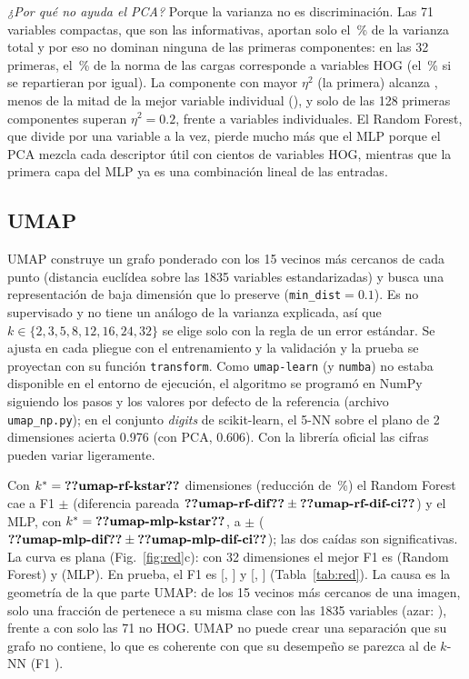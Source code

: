 \documentclass[journal]{IEEEtran}
\begin{document}
\emph{¿Por qué no ayuda el PCA?} Porque la varianza no es discriminación. Las 71 variables compactas, que son las informativas, aportan solo el \,\% de la varianza total y por eso no dominan ninguna de las primeras componentes: en las 32 primeras, el \,\% de la norma de las cargas corresponde a variables HOG (el \,\% si se repartieran por igual). La componente con mayor $\eta^2$ (la primera) alcanza , menos de la mitad de la mejor variable individual (), y solo  de las 128 primeras componentes superan $\eta^2=0.2$, frente a  variables individuales. El Random Forest, que divide por una variable a la vez, pierde mucho más que el MLP porque el PCA mezcla cada descriptor útil con cientos de variables HOG, mientras que la primera capa del MLP ya es una combinación lineal de las entradas.

\subsection{UMAP}\label{sec:umap}
UMAP \cite{mcinnes2018} construye un grafo ponderado con los 15 vecinos más cercanos de cada punto (distancia euclídea sobre las 1835 variables estandarizadas) y busca una representación de baja dimensión que lo preserve (\texttt{min\_dist}$=0.1$). Es no supervisado y no tiene un análogo de la varianza explicada, así que $k\in\{2,3,5,8,12,16,24,32\}$ se elige solo con la regla de un error estándar. Se ajusta en cada pliegue con el entrenamiento y la validación y la prueba se proyectan con su función \texttt{transform}. Como \texttt{umap-learn} (y \texttt{numba}) no estaba disponible en el entorno de ejecución, el algoritmo se programó en NumPy siguiendo los pasos y los valores por defecto de la referencia (archivo \texttt{umap\_np.py}); en el conjunto \emph{digits} de scikit-learn, el 5-NN sobre el plano de 2 dimensiones acierta 0.976 (con PCA, 0.606). Con la librería oficial las cifras pueden variar ligeramente.

Con $k^*=\N{umap-rf-kstar}$ dimensiones (reducción de \,\%) el Random Forest cae a F1 $\pm$ (diferencia pareada $\N{umap-rf-dif}\pm\N{umap-rf-dif-ci}$) y el MLP, con $k^*=\N{umap-mlp-kstar}$, a $\pm$ ($\N{umap-mlp-dif}\pm\N{umap-mlp-dif-ci}$); las dos caídas son significativas. La curva es plana (Fig.~\ref{fig:red}c): con 32 dimensiones el mejor F1 es  (Random Forest) y  (MLP). En prueba, el F1 es  [, ] y  [, ] (Tabla~\ref{tab:red}). La causa es la geometría de la que parte UMAP: de los 15 vecinos más cercanos de una imagen, solo una fracción de  pertenece a su misma clase con las 1835 variables (azar: ), frente a  con solo las 71 no HOG. UMAP no puede crear una separación que su grafo no contiene, lo que es coherente con que su desempeño se parezca al de $k$-NN (F1 ).
\end{document}

